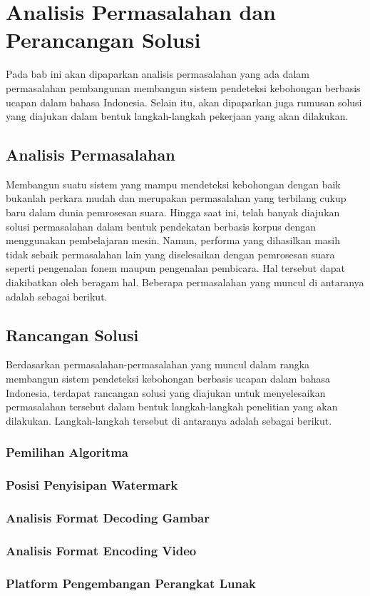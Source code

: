 \chapter{Analisis Permasalahan dan Perancangan Solusi}

  Pada bab ini akan dipaparkan analisis permasalahan yang ada dalam permasalahan pembangunan membangun sistem pendeteksi kebohongan berbasis ucapan dalam bahasa Indonesia. Selain itu, akan dipaparkan juga rumusan solusi yang diajukan dalam bentuk langkah-langkah pekerjaan yang akan dilakukan.

  \section{Analisis Permasalahan}
  
    Membangun suatu sistem yang mampu mendeteksi kebohongan dengan baik bukanlah perkara mudah dan merupakan permasalahan yang terbilang cukup baru dalam dunia pemrosesan suara. Hingga saat ini, telah banyak diajukan solusi permasalahan dalam bentuk pendekatan berbasis korpus dengan menggunakan pembelajaran mesin. Namun, performa yang dihasilkan masih tidak sebaik permasalahan lain yang diselesaikan dengan pemrosesan suara seperti pengenalan fonem maupun pengenalan pembicara. Hal tersebut dapat diakibatkan oleh beragam hal. Beberapa permasalahan yang muncul di antaranya adalah sebagai berikut.

  \section{Rancangan Solusi}
  
    Berdasarkan permasalahan-permasalahan yang muncul dalam rangka membangun sistem pendeteksi kebohongan berbasis ucapan dalam bahasa Indonesia, terdapat rancangan solusi yang diajukan untuk menyelesaikan permasalahan tersebut dalam bentuk langkah-langkah penelitian yang akan dilakukan. Langkah-langkah tersebut di antaranya adalah sebagai berikut.

    \subsection{Pemilihan Algoritma}

    \subsection{Posisi Penyisipan Watermark}

    \subsection{Analisis Format Decoding Gambar}

    \subsection{Analisis Format Encoding Video}

    \subsection{Platform Pengembangan Perangkat Lunak}
